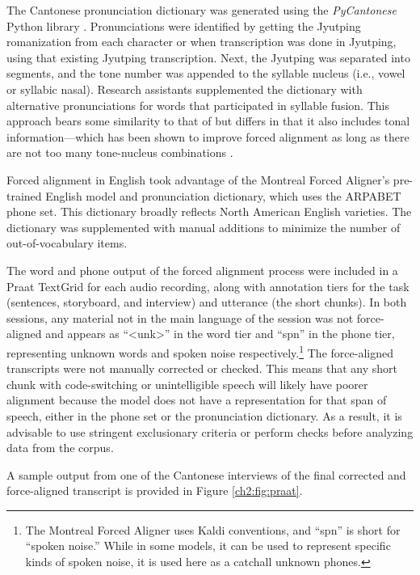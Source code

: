 The Cantonese pronunciation dictionary was generated using the \textit{PyCantonese} Python library \citep{lee_2018_pycantonese}. Pronunciations were identified by getting the Jyutping romanization from each character or when transcription was done in Jyutping, using that existing Jyutping transcription. Next, the Jyutping was separated into segments, and the tone number was appended to the syllable nucleus (i.e., vowel or syllabic nasal). Research assistants supplemented the dictionary with alternative pronunciations for words that participated in syllable fusion. This approach bears some similarity to that of \citet{tse_2019_heritage} but differs in that it also includes tonal information---which has been shown to improve forced alignment as long as there are not too many tone-nucleus combinations \citep{cavar_2016_endangered, yuan_2014_automatic}.

Forced alignment in English took advantage of the Montreal Forced Aligner's pre-trained English model and pronunciation dictionary, which uses the ARPABET phone set. This dictionary broadly reflects North American English varieties. The dictionary was supplemented with manual additions to minimize the number of out-of-vocabulary items.

The word and phone output of the forced alignment process were included in a Praat TextGrid for each audio recording, along with annotation tiers for the task (sentences, storyboard, and interview) and utterance (the short chunks). In both sessions, any material not in the main language of the session was not force-aligned and appears as ``<unk>'' in the word tier and ``spn'' in the phone tier, representing unknown words and spoken noise respectively.\footnote{The Montreal Forced Aligner uses Kaldi conventions, and ``spn'' is short for ``spoken noise.'' While in some models, it can be used to represent specific kinds of spoken noise, it is used here as a catchall unknown phones.} The force-aligned transcripts were not manually corrected or checked. This means that any short chunk with code-switching or unintelligible speech will likely have poorer alignment because the model does not have a representation for that span of speech, either in the phone set or the pronunciation dictionary. As a result, it is advisable to use stringent exclusionary criteria or perform checks before analyzing data from the corpus. 

A sample output from one of the Cantonese interviews of the final corrected and force-aligned transcript is provided in Figure \ref{ch2:fig:praat}.

